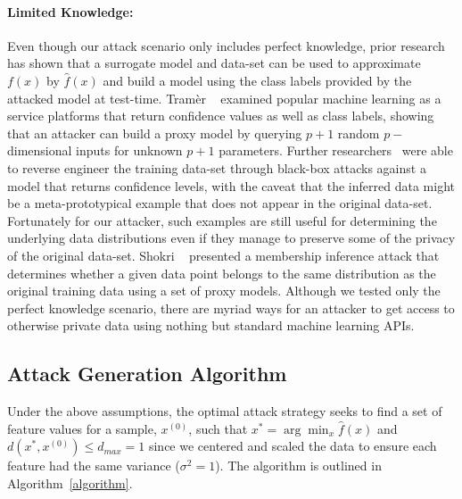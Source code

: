 \documentclass[fonts]{icst}
\begin{document}
\paragraph{Limited Knowledge: }
Even though our attack scenario only includes perfect knowledge, prior research~\cite{fredrikson2015model,biggio2013evasion,chakraborty2018adversarial,wang2019security,ateniese2015hacking} has shown that a surrogate model and data-set can be used to approximate $f(x)$ by $\hat{f}(x)$ and build a model using the class labels provided by the attacked model at test-time.
Tram\`er ~\cite{tramer2016stealing} examined popular machine learning as a service platforms that return confidence values as well as class labels, showing that an attacker can build a proxy model by querying $ p + 1$ random $p-$dimensional inputs for unknown $p+1$ parameters.
Further researchers~\cite{fredrikson2015model} were able to reverse engineer the training data-set through black-box attacks against a model that returns confidence levels, with the caveat that the inferred data might be a meta-prototypical example that does not appear in the original data-set.
Fortunately for our attacker, such examples are still useful for determining the underlying data distributions even if they manage to preserve some of the privacy of the original data-set.
Shokri ~\cite{shokri2017membership} presented a membership inference attack that determines whether a given data point belongs to the same distribution as the original training data using a set of proxy models.
Although we tested only the perfect knowledge scenario, there are myriad ways for an attacker to get access to otherwise private data using nothing but standard machine learning APIs.


\subsection{Attack Generation Algorithm}

Under the above assumptions, the optimal attack strategy seeks to find a set of feature values for a sample, $x^{(0)}$, such that
$x^* = \arg\min_{x}\hat{f}(x)$ and $d(x^*, x^{(0)}) \leq d_{max} = 1$ since we centered and scaled the data to ensure each feature had the same variance ($\sigma^2 = 1$).
The algorithm is outlined in Algorithm~\ref{algorithm}.
\end{document}
